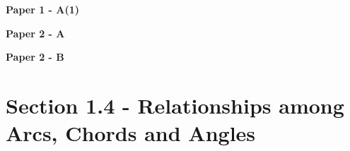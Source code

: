\documentclass[12pt, a4paper]{article}
\begin{document}
\textbf{Paper 1 - A(1)}
\begin{enumx}[label=\arabic*.,start=5]
\item {}\label{DSE2012S-CoreP1-Q07} 
\item {}\label{DSE2015-CoreP1-Q08} 
\end{enumx}
\textbf{Paper 2 - A}
\begin{enumx}[label=\arabic*.,start=7]
\item {}\label{DSE2012S-CoreP2-Q21} 
\item {}\label{DSE2012P-CoreP2-Q20} 
\item {}\label{DSE2012-CoreP2-Q20} 
\item {}\label{DSE2015-CoreP2-Q21} 
\item {}\label{DSE2016-CoreP2-Q22} 
\item {}\label{DSE2018-CoreP2-Q22} 
\item {}\label{DSE2022-CoreP2-Q21} 
\end{enumx}
\textbf{Paper 2 - B}
\begin{enumx}[label=\arabic*.,start=14]
\item {}\label{DSE2017-CoreP2-Q40} 
\end{enumx}




\section*{Section 1.4 - Relationships among Arcs, Chords and Angles}\label{section:5-1-4}
\end{document}
